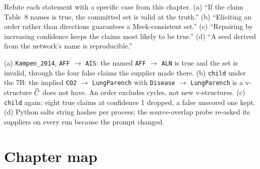 \begin{exercicio}[metodo=counterexample,conceito=quadro-observavel]
Refute each statement with a specific case from this chapter. (a) ``If the claim Table~8 names is true,
the committed set is valid at the truth.'' (b) ``Eliciting an order rather than directions guarantees a
Meek-consistent set.'' (c) ``Repairing by increasing confidence keeps the claims most likely to be
true.'' (d) ``A seed derived from the network's name is reproducible.''
\end{exercicio}
\begin{solucao}
(a) \texttt{Kampen\_2014}, \texttt{AFF} $\to$ \texttt{AIS}: the named \texttt{AFF} $\to$ \texttt{ALN} is
true and the set is invalid, through the four false claims the supplier made there. (b) \texttt{child} under the 7B: the implied
\texttt{CO2} $\to$ \texttt{LungParench} with \texttt{Disease} $\to$ \texttt{LungParench} is a v-structure
$\widehat{C}$ does not have. An order excludes cycles, not new v-structures. (c) \texttt{child} again: eight
true claims at confidence 1 dropped, a false unscored one kept. (d) Python salts string hashes per
process; the source-overlap probe re-asked its suppliers on every run because the prompt changed.
\end{solucao}

\section*{Chapter map}

\begin{center}
\end{center}
